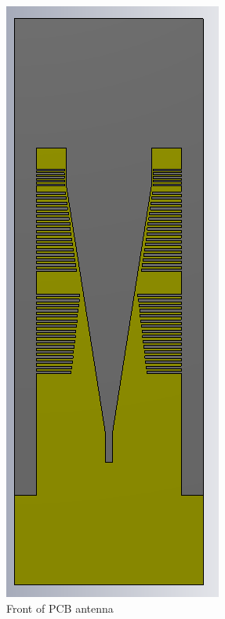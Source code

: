 \begin{figure}[H]
  \centering
  \begin{minipage}[b]{0.5\textwidth}
	\includegraphics[scale = 0.7]{figures/measurement/antenna_front.png}
	\caption{Front of PCB antenna}
    \label{fig:ant_front}
  \end{minipage}
  \hfill
  \begin{minipage}[b]{0.4\textwidth}

\end{minipage}
\end{figure}
